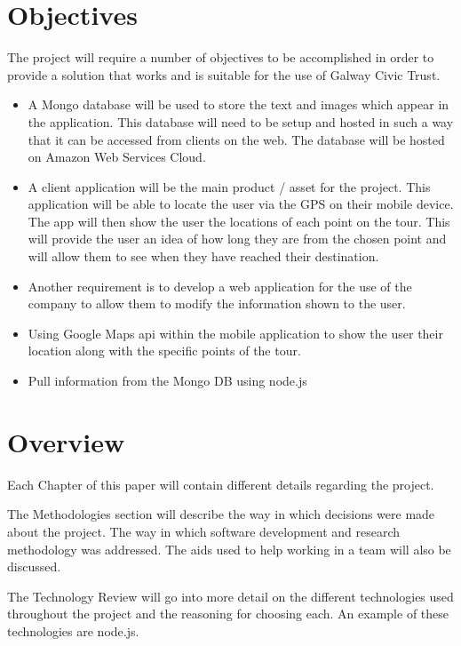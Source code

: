 \section{Objectives} 


The project will require a number of objectives to be accomplished in order to provide a solution that works and is suitable for the use of Galway Civic Trust. 

\begin{itemize}
\item A Mongo database will be used to store the text and images which appear in the application. This database will need to be setup and hosted in such a way that it can be accessed from clients on the web. The database will be hosted on Amazon Web Services Cloud.

\item A client application will be the main product / asset for the project. This application will be able to locate the user via the GPS on their mobile device. The app will then show the user the locations of each point on the tour. This will provide the user an idea of how long they are from the chosen point and will allow them to see when they have reached their destination.

\item Another requirement is to develop a web application for the use of the company to allow them to modify the information shown to the user.

\item Using Google Maps api within the mobile application to show the user their location along with the specific points of the tour.

\item Pull information from the Mongo DB using node.js


\end{itemize}
\section{Overview}

Each Chapter of this paper will contain different details regarding the project. 

The Methodologies section will describe the way in which decisions were made about the project. The way in which software development and research methodology was addressed. The aids used to help working in a team will also be discussed.

The Technology Review will go into more detail on the different technologies used throughout the project and the reasoning for choosing each. An example of these technologies are node.js.


